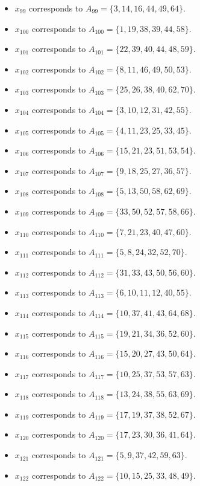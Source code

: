\documentclass[11pt]{article}
\begin{document}
\begin{itemize}
\item $x_{99}$ corresponds to $A_{99}=\{3, 14, 16, 44, 49, 64\}$.
\item $x_{100}$ corresponds to $A_{100}=\{1, 19, 38, 39, 44, 58\}$.
\item $x_{101}$ corresponds to $A_{101}=\{22, 39, 40, 44, 48, 59\}$.
\item $x_{102}$ corresponds to $A_{102}=\{8, 11, 46, 49, 50, 53\}$.
\item $x_{103}$ corresponds to $A_{103}=\{25, 26, 38, 40, 62, 70\}$.
\item $x_{104}$ corresponds to $A_{104}=\{3, 10, 12, 31, 42, 55\}$.
\item $x_{105}$ corresponds to $A_{105}=\{4, 11, 23, 25, 33, 45\}$.
\item $x_{106}$ corresponds to $A_{106}=\{15, 21, 23, 51, 53, 54\}$.
\item $x_{107}$ corresponds to $A_{107}=\{9, 18, 25, 27, 36, 57\}$.
\item $x_{108}$ corresponds to $A_{108}=\{5, 13, 50, 58, 62, 69\}$.
\item $x_{109}$ corresponds to $A_{109}=\{33, 50, 52, 57, 58, 66\}$.
\item $x_{110}$ corresponds to $A_{110}=\{7, 21, 23, 40, 47, 60\}$.
\item $x_{111}$ corresponds to $A_{111}=\{5, 8, 24, 32, 52, 70\}$.
\item $x_{112}$ corresponds to $A_{112}=\{31, 33, 43, 50, 56, 60\}$.
\item $x_{113}$ corresponds to $A_{113}=\{6, 10, 11, 12, 40, 55\}$.
\item $x_{114}$ corresponds to $A_{114}=\{10, 37, 41, 43, 64, 68\}$.
\item $x_{115}$ corresponds to $A_{115}=\{19, 21, 34, 36, 52, 60\}$.
\item $x_{116}$ corresponds to $A_{116}=\{15, 20, 27, 43, 50, 64\}$.
\item $x_{117}$ corresponds to $A_{117}=\{10, 25, 37, 53, 57, 63\}$.
\item $x_{118}$ corresponds to $A_{118}=\{13, 24, 38, 55, 63, 69\}$.
\item $x_{119}$ corresponds to $A_{119}=\{17, 19, 37, 38, 52, 67\}$.
\item $x_{120}$ corresponds to $A_{120}=\{17, 23, 30, 36, 41, 64\}$.
\item $x_{121}$ corresponds to $A_{121}=\{5, 9, 37, 42, 59, 63\}$.
\item $x_{122}$ corresponds to $A_{122}=\{10, 15, 25, 33, 48, 49\}$.

\end{itemize}
\end{document}
